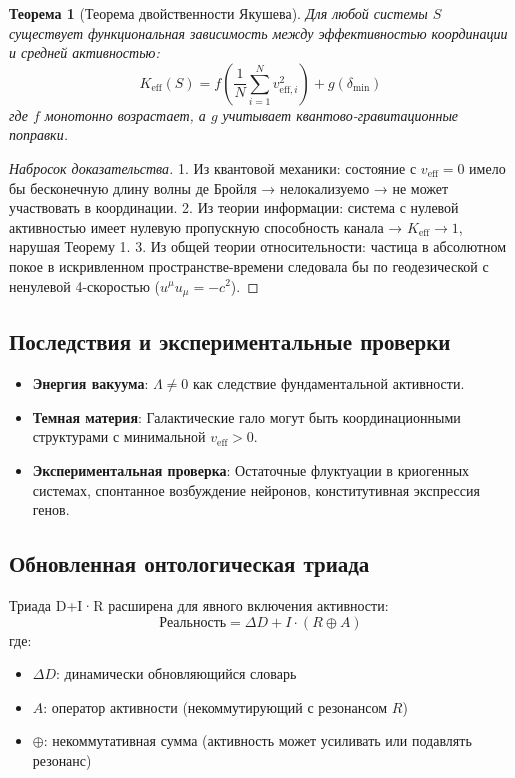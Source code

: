 \documentclass[11pt,a4paper]{article}
\newtheorem{theorem}{Теорема}
\begin{document}
	\begin{theorem}[Теорема двойственности Якушева]
		Для любой системы $S$ существует функциональная зависимость между эффективностью координации и средней активностью:
		\[
		K_{\mathrm{eff}}(S) = f\left( \frac{1}{N}\sum_{i=1}^N v_{\mathrm{eff},i}^2 \right) + g(\delta_{\min})
		\]
		где $f$ монотонно возрастает, а $g$ учитывает квантово-гравитационные поправки.
	\end{theorem}
	
	\begin{proof}[Набросок доказательства]
		1. Из квантовой механики: состояние с $v_{\mathrm{eff}} = 0$ имело бы бесконечную длину волны де Бройля → нелокализуемо → не может участвовать в координации.
		2. Из теории информации: система с нулевой активностью имеет нулевую пропускную способность канала → $K_{\mathrm{eff}} \to 1$, нарушая Теорему 1.
		3. Из общей теории относительности: частица в абсолютном покое в искривленном пространстве-времени следовала бы по геодезической с ненулевой 4-скоростью ($u^\mu u_\mu = -c^2$).
	\end{proof}
	
	\subsection{Последствия и экспериментальные проверки}
	
	\begin{itemize}
		\item \textbf{Энергия вакуума}: $\Lambda \neq 0$ как следствие фундаментальной активности.
		\item \textbf{Темная материя}: Галактические гало могут быть координационными структурами с минимальной $v_{\mathrm{eff}} > 0$.
		\item \textbf{Экспериментальная проверка}: Остаточные флуктуации в криогенных системах, спонтанное возбуждение нейронов, конститутивная экспрессия генов.
	\end{itemize}
	
	\subsection{Обновленная онтологическая триада}
	
	Триада D+I·R расширена для явного включения активности:
	\[
	\boxed{\mathrm{Реальность} = \Delta D + I \cdot (R \oplus A)}
	\]
	где:
	\begin{itemize}
		\item $\Delta D$: динамически обновляющийся словарь
		\item $A$: оператор активности (некоммутирующий с резонансом $R$)
		\item $\oplus$: некоммутативная сумма (активность может усиливать или подавлять резонанс)
	\end{itemize}
	
\end{document}
